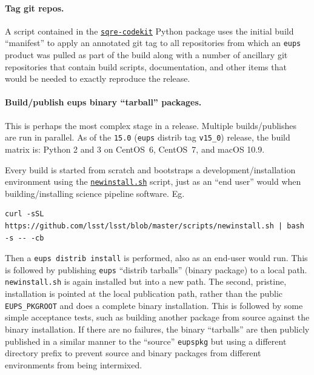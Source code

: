 \paragraph{Tag git repos.}

A script contained in the
\href{https://github.com/lsst-sqre/sqre-codekit}{\texttt{sqre-codekit}} Python package
uses the initial build ``manifest'' to apply an annotated git tag to all
repositories from which an \texttt{eups} product was pulled as part of the
build along with a number of ancillary git repositories that contain build
scripts, documentation, and other items that would be needed to exactly reproduce the
release.

\paragraph{Build/publish eups binary ``tarball'' packages.}

This is perhaps the most complex stage in a release.  Multiple builds/publishes
are run in parallel.  As of the \texttt{15.0} (\texttt{eups} distrib tag
\texttt{v15\_0}) release, the build matrix is: Python 2 and 3 on CentOS~6, CentOS~7, and macOS 10.9.

Every build is started from scratch and bootstraps a development/installation environment using the \href{https://github.com/lsst/lsst/blob/master/scripts/newinstall.sh}{\texttt{new\-install.sh}}\cite{pipelines-guide} script, just as an ``end user'' would when building/installing science pipeline software. Eg.

\begin{verbatim}
curl -sSL https://github.com/lsst/lsst/blob/master/scripts/newinstall.sh | bash -s -- -cb
\end{verbatim}

Then a \texttt{eups distrib install} is performed, also as an end-user would
run.  This is followed by publishing \texttt{eups} ``distrib tarballs'' (binary
package) to a local path.  \texttt{newinstall.sh} is again installed but into a
new path.  The second, pristine, installation is pointed at the local publication
path, rather than the public \texttt{EUPS\_PKGROOT} and does a complete binary
installation.  This is followed by some simple acceptance tests, such as
building another package from source against the binary installation.  If there
are no failures, the binary ``tarballs'' are then publicly published in a
similar manner to the ``source'' \texttt{eupspkg} but using a different
directory prefix to prevent source and binary packages from different
environments from being intermixed.

